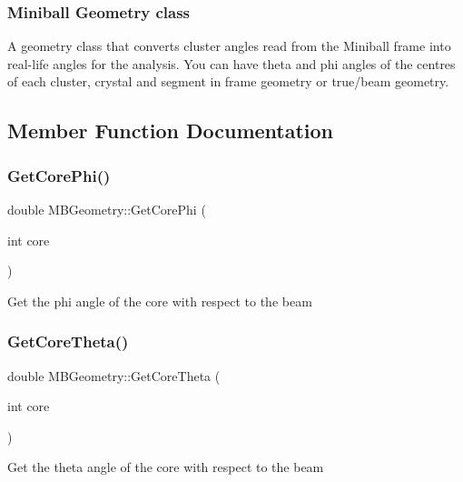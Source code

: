 \subsubsection*{Miniball Geometry class }

A geometry class that converts cluster angles read from the Miniball frame into real-\/life angles for the analysis. You can have theta and phi angles of the centres of each cluster, crystal and segment in frame geometry or true/beam geometry. 

\subsection{Member Function Documentation}
\mbox{\label{class_m_b_geometry_a39f685610ae0e68e547a46f8ef992599}} 
\subsubsection{\texorpdfstring{Get\+Core\+Phi()}{GetCorePhi()}}
{\footnotesize\ttfamily double M\+B\+Geometry\+::\+Get\+Core\+Phi (\begin{DoxyParamCaption}\item[{int}]{core }\end{DoxyParamCaption})}

Get the phi angle of the core with respect to the beam \mbox{\label{class_m_b_geometry_a42aa536f15017724812712b0f8a77c12}} 
\subsubsection{\texorpdfstring{Get\+Core\+Theta()}{GetCoreTheta()}}
{\footnotesize\ttfamily double M\+B\+Geometry\+::\+Get\+Core\+Theta (\begin{DoxyParamCaption}\item[{int}]{core }\end{DoxyParamCaption})}

Get the theta angle of the core with respect to the beam \mbox{\label{class_m_b_geometry_a575ddd6022d2d686a83ebce3195b6c50}} 

